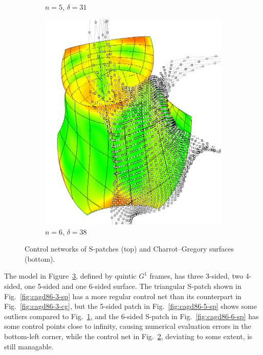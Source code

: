 \documentclass[9pt,academicons]{article}
\begin{document}
\begin{figure}[!ht]
{\begin{subfigure}{.3\textwidth}
      \caption{$n=5$, $\delta=31$}
      \label{fig:cagd86-5-cg}
    \end{subfigure}
    \hfill
    \begin{subfigure}{.3\textwidth}
      \centering
      \includegraphics[width=.9\textwidth]{images/cagd86/cg1.png}
      \caption{$n=6$, $\delta=38$}
      \label{fig:cagd86-6-cg}
    \end{subfigure}
    \hfill
  }
  \caption{Control networks of S-patches (top) and Charrot--Gregory surfaces (bottom).}
  \label{fig:cagd86}
\end{figure}
The model in Figure~\ref{fig:cagd86}, defined by quintic $G^1$ frames,
has three 3-sided, two 4-sided, one 5-sided and one 6-sided surface.
The triangular S-patch shown in Fig.~\ref{fig:cagd86-3-sp} has a more regular
control net than its counterpart in Fig.~\ref{fig:cagd86-3-cg},
but the 5-sided patch in Fig.~\ref{fig:cagd86-5-sp}
shows some outliers compared to Fig.~\ref{fig:cagd86-5-cg},
and the 6-sided S-patch in Fig.~\ref{fig:cagd86-6-sp} has some
control points close to infinity, causing numerical evaluation errors
in the bottom-left corner, while the control net
in Fig.~\ref{fig:cagd86-6-cg}, deviating to some extent, is still managable.
\end{document}
